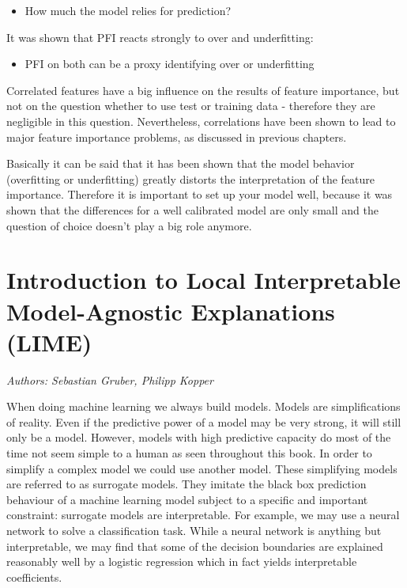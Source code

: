 \documentclass[
]{krantz}
\providecommand{\tightlist}{%
  \setlength{\itemsep}{0pt}\setlength{\parskip}{0pt}}
\begin{document}
\begin{itemize}
\tightlist
\item
  How much the model relies for prediction?
\end{itemize}

It was shown that PFI reacts strongly to over and underfitting:

\begin{itemize}
\tightlist
\item
  PFI on both can be a proxy identifying over or underfitting
\end{itemize}

Correlated features have a big influence on the results of feature importance, but not on the question whether to use test or training data - therefore they are negligible in this question. Nevertheless, correlations have been shown to lead to major feature importance problems, as discussed in previous chapters.

Basically it can be said that it has been shown that the model behavior (overfitting or underfitting) greatly distorts the interpretation of the feature importance. Therefore it is important to set up your model well, because it was shown that the differences for a well calibrated model are only small and the question of choice doesn't play a big role anymore.

\hypertarget{introduction-to-local-interpretable-model-agnostic-explanations-lime}{%
\chapter{Introduction to Local Interpretable Model-Agnostic Explanations (LIME)}\label{introduction-to-local-interpretable-model-agnostic-explanations-lime}}

\emph{Authors: Sebastian Gruber, Philipp Kopper}

When doing machine learning we always build models.
Models are simplifications of reality.
Even if the predictive power of a model may be very strong, it will still only be a model.
However, models with high predictive capacity do most of the time not seem simple to a human as seen throughout this book.
In order to simplify a complex model we could use another model.
These simplifying models are referred to as surrogate models.
They imitate the black box prediction behaviour of a machine learning model subject to a specific and important constraint:
surrogate models are interpretable.
For example, we may use a neural network to solve a classification task.
While a neural network is anything but interpretable, we may find that some of the decision boundaries are explained reasonably well by a logistic regression which in fact yields interpretable coefficients.
\end{document}

